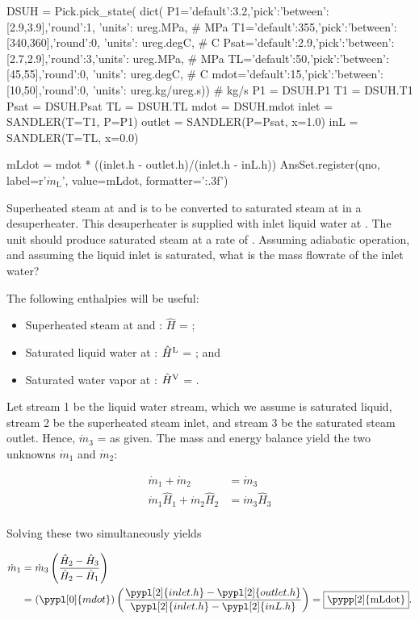 \begin{pycode}
DSUH = Pick.pick_state(
    dict(
        P1={'default':3.2,'pick':{'between':[2.9,3.9],'round':1}, 'units': ureg.MPa}, # MPa
        T1={'default':355,'pick':{'between':[340,360],'round':0}, 'units': ureg.degC}, # C
        Psat={'default':2.9,'pick':{'between':[2.7,2.9],'round':3},'units': ureg.MPa}, # MPa
        TL={'default':50,'pick':{'between':[45,55],'round':0}, 'units': ureg.degC}, # C
        mdot={'default':15,'pick':{'between':[10,50],'round':0}, 'units': ureg.kg/ureg.s})) # kg/s
P1  = DSUH.P1
T1 = DSUH.T1
Psat = DSUH.Psat
TL = DSUH.TL
mdot = DSUH.mdot
inlet = SANDLER(T=T1, P=P1)
outlet = SANDLER(P=Psat, x=1.0)
inL = SANDLER(T=TL, x=0.0)

mLdot = mdot * ((inlet.h - outlet.h)/(inlet.h - inL.h))
AnsSet.register(qno, label=r'\(\dot{m}_\mathrm{L}\)', value=mLdot, formatter='{:.3f}')
\end{pycode}
Superheated steam at  and  is to be converted to saturated steam at  in a desuperheater.  This desuperheater is supplied with inlet liquid water at .  The unit should produce saturated steam at a rate of .  Assuming adiabatic operation, and assuming the liquid inlet is saturated, what is the mass flowrate of the inlet water?

The following enthalpies will be useful:
\begin{itemize}
\item[] Superheated steam at  and : $\hat{H}$ = ;
\item[] Saturated liquid water at : $\hat{H}^{\rm L}$ = ; and
\item[] Saturated water vapor at : $\hat{H}^{\rm V}$ = .
\end{itemize}

\ifshowsolutions\Solutionheader

Let stream 1 be the liquid water stream, which we assume is saturated liquid, stream 2 be the superheated steam inlet, and stream 3 be the saturated steam outlet.  Hence, $\dot{m}_3$ =  as given.  The mass and energy balance yield the two unknowns $\dot{m}_1$ and $\dot{m}_2$:

\begin{align*}
\dot{m}_1 + \dot{m}_2 & = \dot{m}_3\\
\dot{m}_1\hat{H}_1 + \dot{m}_2\hat{H}_2 & = \dot{m}_3\hat{H}_3\\
\end{align*}

Solving these two simultaneously yields 

\begin{align*}
\dot{m}_1 & = \dot{m}_3\left(\frac{\hat{H}_2-\hat{H}_3}{\hat{H}_2-\hat{H}_1}\right)\\
& = \left(\pypl[0]{mdot}\right)\left(\frac{\pypl[2]{inlet.h}-\pypl[2]{outlet.h}}{\pypl[2]{inlet.h}-\pypl[2]{inL.h}}\right) = \fbox{\pypp[2]{mLdot}}.
\end{align*}
\clearpage
\else
\ifgivespace
\clearpage
\fi
\fi

